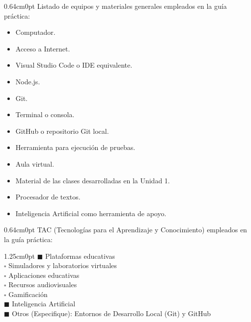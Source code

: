 \documentclass[12pt,letterpaper]{article}
\begin{document}
\vspace{4pt}

\vspace{2pt}
\begin{adjustwidth}{0.64cm}{0pt}
Listado de equipos y materiales generales empleados en la gu\'ia pr\'actica:
\end{adjustwidth}

\begin{itemize}[leftmargin=1.27cm, label=\textbullet, topsep=1pt, itemsep=0pt, parsep=0pt]
  \item Computador.
  \item Acceso a Internet.
  \item Visual Studio Code o IDE equivalente.
  \item Node.js.
  \item Git.
  \item Terminal o consola.
  \item GitHub o repositorio Git local.
  \item Herramienta para ejecuci\'on de pruebas.
  \item Aula virtual.
  \item Material de las clases desarrolladas en la Unidad 1.
  \item Procesador de textos.
  \item Inteligencia Artificial como herramienta de apoyo.
\end{itemize}

\vspace{4pt}
\begin{adjustwidth}{0.64cm}{0pt}
TAC (Tecnolog\'ias para el Aprendizaje y Conocimiento) empleados en la gu\'ia pr\'actica:
\end{adjustwidth}

\begin{adjustwidth}{1.25cm}{0pt}
\vspace{2pt}
$\blacksquare$ \; Plataformas educativas\\[2pt]
$\square$ \; Simuladores y laboratorios virtuales\\[2pt]
$\square$ \; Aplicaciones educativas\\[2pt]
$\square$ \; Recursos audiovisuales\\[2pt]
$\square$ \; Gamificaci\'on\\[2pt]
$\blacksquare$ \; Inteligencia Artificial\\[2pt]
$\blacksquare$ \; Otros (Especifique): Entornos de Desarrollo Local (Git) y GitHub
\end{adjustwidth}
\end{document}
